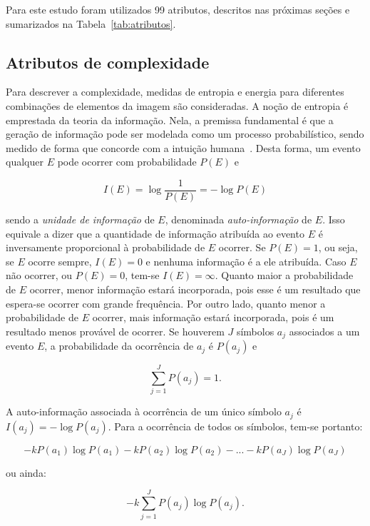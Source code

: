 Para este estudo foram utilizados 99 atributos, descritos nas próximas
seções e sumarizados na Tabela~\ref{tab:atributos}.

\subsection{Atributos de complexidade}

Para descrever a complexidade, medidas de entropia e energia para
diferentes combinações de elementos da imagem são consideradas. A
noção de entropia é emprestada da teoria da informação. Nela, a
premissa fundamental é que a geração de informação pode ser modelada
como um processo probabilístico, sendo medido de forma que concorde
com a intuição humana~\cite{gonzalez}. Desta forma, um evento qualquer
$E$ pode ocorrer com probabilidade $P(E)$ e

\begin{equation}
  I(E) = \log\frac{1}{P(E)} = -\log P(E)
\end{equation}

\noindent sendo a \emph{unidade de informação} de $E$, denominada
\emph{auto-informação} de $E$. Isso equivale a dizer que a quantidade
de informação atribuída ao evento $E$ é inversamente proporcional à
probabilidade de $E$ ocorrer. Se $P(E) = 1$, ou seja, se $E$ ocorre
sempre, $I(E) = 0$ e nenhuma informação é a ele atribuída. Caso $E$
não ocorrer, ou $P(E) = 0$, tem-se $I(E) = \infty$. Quanto maior a
probabilidade de $E$ ocorrer, menor informação estará incorporada,
pois esse é um resultado que espera-se ocorrer com grande
frequência. Por outro lado, quanto menor a probabilidade de $E$
ocorrer, mais informação estará incorporada, pois é um resultado menos
provável de ocorrer. Se houverem $J$ símbolos $a_j$ associados a um
evento $E$, a probabilidade da ocorrência de $a_j$ é $P(a_j)$ e

\begin{equation}
  \sum_{j=1}^J P(a_j) = 1.
\end{equation}

\noindent A auto-informação associada à ocorrência de um único símbolo
$a_j$ é $I(a_j) = -\log P(a_j)$. Para a ocorrência de todos os
símbolos, tem-se portanto:

\begin{equation}
  -kP(a_1) \log P(a_1) -kP(a_2) \log P(a_2) -...-kP(a_J) \log P(a_J)
\end{equation}

\noindent ou ainda:

\begin{equation}
  -k \sum_{j=1}^J P(a_j) \log P(a_j).
\end{equation}

